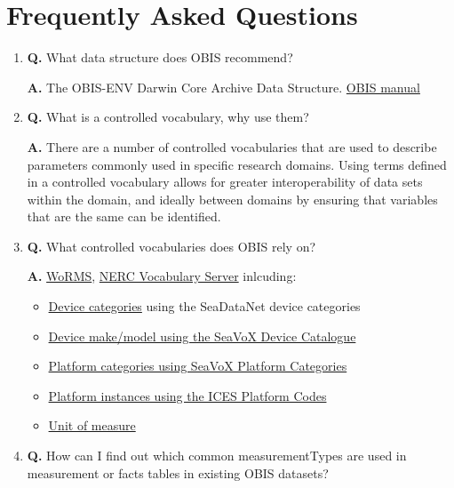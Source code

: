 \documentclass[
]{book}
\providecommand{\tightlist}{%
  \setlength{\itemsep}{0pt}\setlength{\parskip}{0pt}}
\begin{document}
\hypertarget{appendix-appendix}{%
\appendix}


\hypertarget{frequently-asked-questions}{%
\chapter{Frequently Asked Questions}\label{frequently-asked-questions}}

\begin{enumerate}
\def\labelenumi{\arabic{enumi}.}
\item
  \textbf{Q.} What data structure does OBIS recommend?

  \textbf{A.} The OBIS-ENV Darwin Core Archive Data Structure. \href{https://manual.obis.org/data_format.html\#obis-holds-more-than-just-species-occurrences-the-env-data-approach}{OBIS manual}
\item
  \textbf{Q.} What is a controlled vocabulary, why use them?

  \textbf{A.} There are a number of controlled vocabularies that are used to describe parameters commonly used in specific research domains. Using terms defined in a controlled vocabulary allows for greater interoperability of data sets within the domain, and ideally between domains by ensuring that variables that are the same can be identified.
\item
  \textbf{Q.} What controlled vocabularies does OBIS rely on?

  \textbf{A.} \href{https://www.marinespecies.org/}{WoRMS}, \href{http://vocab.nerc.ac.uk/}{NERC Vocabulary Server} inlcuding:

  \begin{itemize}
  \tightlist
  \item
    \href{http://vocab.nerc.ac.uk/collection/L05/current/}{Device categories} using the SeaDataNet device categories
  \item
    \href{http://vocab.nerc.ac.uk/collection/L22/current/}{Device make/model using the SeaVoX Device Catalogue}
  \item
    \href{http://vocab.nerc.ac.uk/collection/L06/current/}{Platform categories using SeaVoX Platform Categories}
  \item
    \href{http://vocab.nerc.ac.uk/collection/C17/current/}{Platform instances using the ICES Platform Codes}
  \item
    \href{http://vocab.nerc.ac.uk/collection/P06/current/}{Unit of measure}
  \end{itemize}
\item
  \textbf{Q.} How can I find out which common measurementTypes are used in measurement or facts tables in existing OBIS datasets?


\end{enumerate}
\end{document}

